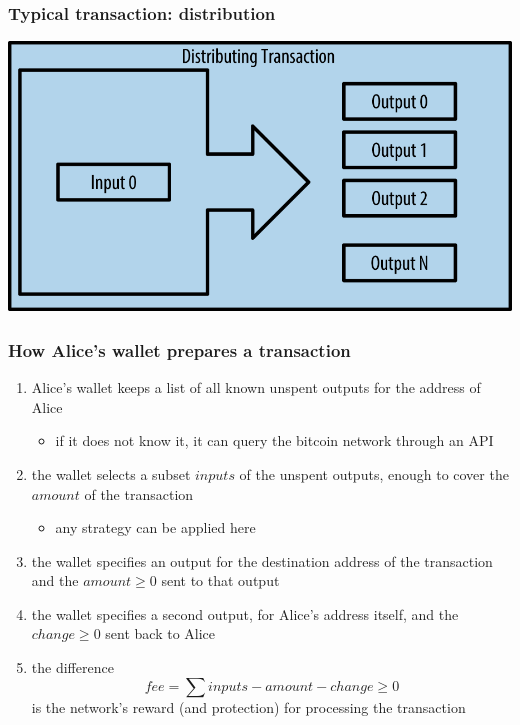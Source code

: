 \documentclass[11pt]{beamer}  %
\begin{document}
\begin{frame}\frametitle{Typical transaction: distribution}

  \begin{center}
    \includegraphics[scale=1.2,clip=false]{pictures/mbc2_0207.png}
  \end{center}

\end{frame}

\begin{frame}\frametitle{How Alice's wallet prepares a transaction}

  \begin{enumerate}
  \item Alice's wallet keeps a list of all known unspent outputs for the address
    of Alice
    \begin{itemize}
    \item if it does not know it, it can query the bitcoin network through an API
    \end{itemize}
  \item the wallet selects a subset $\mathit{inputs}$ of the unspent outputs, enough to cover
    the $\mathit{amount}$ of the transaction
    \begin{itemize}
    \item any strategy can be applied here
    \end{itemize}
  \item the wallet specifies an output for the destination address of the transaction
    and the $\mathit{amount}\ge 0$ sent to that output
  \item the wallet specifies a second output, for Alice's address itself, and the
    $\mathit{change}\ge 0$ sent back to Alice
  \item the difference
    \[
    \mathit{fee}=\sum\mathit{inputs}-\mathit{amount}-\mathit{change}\ge 0
    \]
    is the network's reward (and protection) for processing the transaction
  \end{enumerate}

\end{frame}
\end{document}
